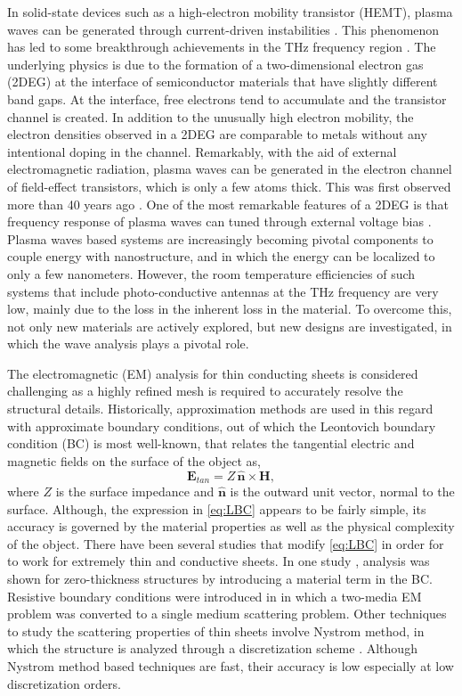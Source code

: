\documentclass{ieeeaccess}
\renewcommand{\v}[1]{\mathbf{#1}} %
\newcommand{\x}{\times}  %
\renewcommand{\^}{\hat}  %
\begin{document}
In solid-state devices such as a high-electron mobility transistor (HEMT), plasma waves can be generated through current-driven instabilities \cite{Kempa1991}. This phenomenon has led to some breakthrough achievements in the THz frequency region \cite{Dyer2016,Wu2015,Dyakonov1993,Dyakonov1996,Popov2005,Otsuji2006,Dyakonov2005}. The underlying physics is due to the formation of a two-dimensional electron gas (2DEG) at the interface of semiconductor materials that have slightly different band gaps. At the interface, free electrons tend to accumulate and the transistor channel is created. In addition to the unusually high electron mobility, the electron densities observed in a 2DEG are comparable to metals without any intentional doping in the channel. Remarkably, with the aid of external electromagnetic radiation, plasma waves can be generated in the electron channel of field-effect transistors, which is only a few atoms thick. This was first observed more than 40 years ago \cite{Stern1967,Allen1977}. One of the most remarkable features of a 2DEG is that frequency response of plasma waves can tuned through external voltage bias \cite{Fatimy2010, Rabbaa2011}. Plasma waves based systems are increasingly becoming pivotal components to couple energy with nanostructure, and in which the energy can be localized to only a few nanometers. However, the room temperature efficiencies of such systems that include photo-conductive antennas at the THz frequency are very low, mainly due to the loss in the inherent loss in the material. To overcome this, not only new materials are actively explored, but new designs are investigated, in which the wave analysis plays a pivotal role.

The electromagnetic (EM) analysis for thin conducting sheets is considered challenging as a highly refined mesh is required to accurately resolve the structural details. Historically, approximation methods are used in this regard with approximate boundary conditions, out of which the Leontovich boundary condition (BC) \cite{Senior1995,Hoppe1995} is most well-known, that relates the tangential electric and magnetic fields on the surface of the object as,
%
\begin{equation}
  \v E_{tan} = Z \, \^{\v{n}} \x \v H,
  \label{eq:LBC}
\end{equation} 
% 
where $Z$ is the surface impedance and $\v{\^{n}}$ is the outward unit vector, normal to the surface. Although, the expression in \eqref{eq:LBC} appears to be fairly simple, its accuracy is governed by the material properties as well as the physical complexity of the object. There have been several studies that modify \eqref{eq:LBC} in order for to work for extremely thin and conductive sheets. In one study \cite{Karlsson}, analysis was shown for zero-thickness structures by introducing a material term in the BC. Resistive boundary conditions were introduced in \cite{senior1979backscattering} in which a two-media EM problem was converted to a single medium scattering problem. Other techniques to study the scattering properties of thin sheets involve Nystrom method, in which the structure is analyzed through a discretization scheme \cite{Olga}. Although Nystrom method based techniques are fast, their accuracy is low especially at low discretization orders. 
\end{document}
